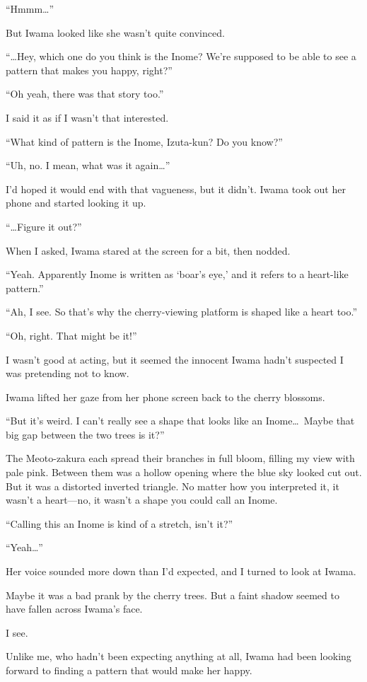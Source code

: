 \documentclass[
    a4paper,
    12pt,
    twoside,
    openany,
    UTF8,
    fontset=windows
]{ctexbook}
\begin{document}
``Hmmm\dots''

But Iwama looked like she wasn't quite convinced.

``\dots Hey, which one do you think is the Inome? We're supposed to be able to see a pattern that makes you happy, right?''

``Oh yeah, there was that story too.''

I said it as if I wasn't that interested.

``What kind of pattern is the Inome, Izuta-kun? Do you know?''

``Uh, no. I mean, what was it again\dots''

I'd hoped it would end with that vagueness, but it didn't. Iwama took out her phone and started looking it up.

``\dots Figure it out?''

When I asked, Iwama stared at the screen for a bit, then nodded.

``Yeah. Apparently Inome is written as `boar's eye,' and it refers to a heart-like pattern.''

``Ah, I see. So that's why the cherry-viewing platform is shaped like a heart too.''

``Oh, right. That might be it!''

I wasn't good at acting, but it seemed the innocent Iwama hadn't suspected I was pretending not to know.

Iwama lifted her gaze from her phone screen back to the cherry blossoms.

``But it's weird. I can't really see a shape that looks like an Inome\dots\ Maybe that big gap between the two trees is it?''

The Meoto-zakura each spread their branches in full bloom, filling my view with pale pink. Between them was a hollow opening where the blue sky looked cut out. But it was a distorted inverted triangle. No matter how you interpreted it, it wasn't a heart---no, it wasn't a shape you could call an Inome.

``Calling this an Inome is kind of a stretch, isn't it?''

``Yeah\dots''

Her voice sounded more down than I'd expected, and I turned to look at Iwama.

Maybe it was a bad prank by the cherry trees. But a faint shadow seemed to have fallen across Iwama's face.

I see.

Unlike me, who hadn't been expecting anything at all, Iwama had been looking forward to finding a pattern that would make her happy.
\end{document}
